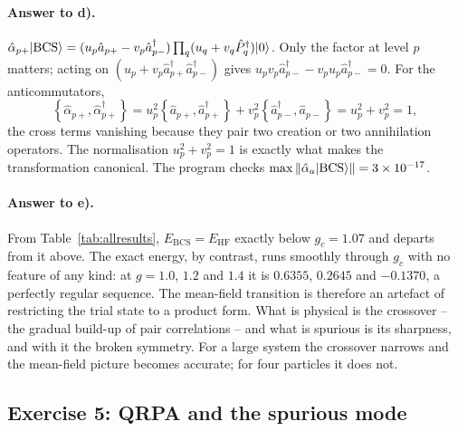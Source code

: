 \paragraph{Answer to d).}
$\hat{\alpha}_{p+}\vert \mathrm{BCS} \rangle
=(u_p\hat{a}_{p+}-v_p\hat{a}^{\dagger}_{p-})
\prod_q(u_q+v_q\hat{P}^{\dagger}_q)\vert 0 \rangle$.  Only the factor at level $p$
matters; acting on $(u_p+v_p\hat{a}^{\dagger}_{p+}\hat{a}^{\dagger}_{p-})$
gives $u_pv_p\hat{a}^{\dagger}_{p-}-v_pu_p\hat{a}^{\dagger}_{p-}=0$.  For the
anticommutators,
\begin{equation}
  \left\{\hat{\alpha}_{p+},\hat{\alpha}^{\dagger}_{p+}\right\}
   = u_p^2\left\{\hat{a}_{p+},\hat{a}^{\dagger}_{p+}\right\}
   + v_p^2\left\{\hat{a}^{\dagger}_{p-},\hat{a}_{p-}\right\}
   = u_p^2+v_p^2 = 1,
  \label{eq:7-exd4}
\end{equation}
the cross terms
vanishing because they pair two creation or two annihilation operators.  The
normalisation $u_p^2+v_p^2=1$ is exactly what makes the transformation
canonical.  The program checks
$\max\Vert\hat{\alpha}_a\vert \mathrm{BCS} \rangle\Vert=3\times10^{-17}$.

\paragraph{Answer to e).}
From Table~\ref{tab:allresults}, $E_{\mathrm{BCS}}=E_{\mathrm{HF}}$ exactly
below $g_c=1.07$ and departs from it above.  The exact energy, by contrast,
runs smoothly through $g_c$ with no feature of any kind: at $g=1.0$, $1.2$ and
$1.4$ it is $0.6355$, $0.2645$ and $-0.1370$, a perfectly regular sequence.
The mean-field transition is therefore an artefact of restricting the trial
state to a product form.  What is physical is the crossover -- the gradual
build-up of pair correlations -- and what is spurious is its sharpness, and
with it the broken symmetry.  For a large system the crossover narrows and the
mean-field picture becomes accurate; for four particles it does not.

\subsection*{Exercise 5: QRPA and the spurious mode}
\label{ex:7-qrpa}

